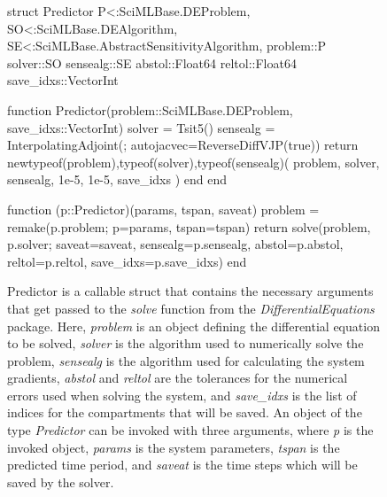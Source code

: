 \begin{figure}[!htb]
\begin{jllisting}
struct Predictor{
    P<:SciMLBase.DEProblem,
    SO<:SciMLBase.DEAlgorithm,
    SE<:SciMLBase.AbstractSensitivityAlgorithm,
}
    problem::P
    solver::SO
    sensealg::SE
    abstol::Float64
    reltol::Float64
    save_idxs::Vector{Int}

    function Predictor(problem::SciMLBase.DEProblem, save_idxs::Vector{Int})
        solver = Tsit5()
        sensealg = InterpolatingAdjoint(; autojacvec=ReverseDiffVJP(true))
        return new{typeof(problem),typeof(solver),typeof(sensealg)}(
            problem, solver, sensealg, 1e-5, 1e-5, save_idxs
        )
    end
end

function (p::Predictor)(params, tspan, saveat)
    problem = remake(p.problem; p=params, tspan=tspan)
    return solve(problem, p.solver;
                 saveat=saveat,
                 sensealg=p.sensealg,
                 abstol=p.abstol,
                 reltol=p.reltol,
                 save_idxs=p.save_idxs)
end
\end{jllisting}
\caption{Predictor is a callable struct that contains the necessary arguments that get passed to the \textit{solve} function from the \textit{DifferentialEquations} package. Here, \textit{problem} is an object defining the differential equation to be solved, \textit{solver} is the algorithm used to numerically solve the problem, \textit{sensealg} is the algorithm used for calculating the system gradients, \textit{abstol} and \textit{reltol} are the tolerances for the numerical errors used when solving the system, and \textit{save\_idxs} is the list of indices for the compartments that will be saved. An object of the type \textit{Predictor} can be invoked with three arguments, where \textit{p} is the invoked object, \textit{params} is the system parameters, \textit{tspan} is the predicted time period, and \textit{saveat} is the time steps which will be saved by the solver.}
\label{fig:diffeq-seird-predictor}
\end{figure}

